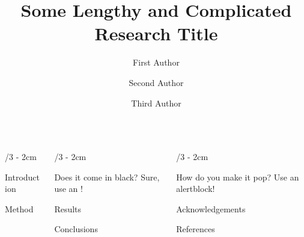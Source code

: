 \documentclass[landscape]{uioposter}
\title{Some Lengthy and Complicated Research Title}
\author
{%
    First Author%
    \and
    Second Author%
    \and
    Third Author%
}
\begin{document}
\begin{frame}
\begin{columns}[onlytextwidth]


\begin{column}{\textwidth/3 - 2cm}
    \begin{block}{Introduction}
        \lipsum[1]
    \end{block}

    \begin{block}{Method}
        \lipsum[2]
    \end{block}
\end{column}


\begin{column}{\textwidth/3 - 2cm}
    \begin{exampleblock}{Does it come in black?}
        Sure, use an !
    \end{exampleblock}

    \begin{block}{Results}
        \lipsum[75]
        \unskip
    \end{block}

    \begin{block}{Conclusions}
        \lipsum[6]
    \end{block}
\end{column}


\begin{column}{\textwidth/3 - 2cm}
    \begin{alertblock}{How do you make it pop?}
        Use an \alert{alertblock}!
    \end{alertblock}

    \begin{block}{Acknowledgements}
        \lipsum[4]
    \end{block}

    \begin{block}{References}
       \lipsum[6]
    \end{block}
\end{column}


\end{columns}
\end{frame}
\end{document}
